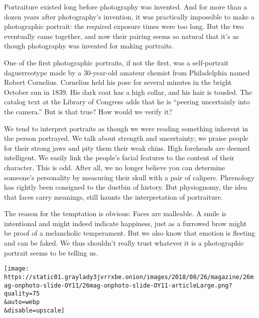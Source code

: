 Portraiture existed long before photography was invented. And for more
than a dozen years after photography's invention, it was practically
impossible to make a photographic portrait: the required exposure times
were too long. But the two eventually came together, and now their
pairing seems so natural that it's as though photography was invented
for making portraits.

One of the first photographic portraits, if not the first, was a
self-portrait daguerreotype made by a 30-year-old amateur chemist from
Philadelphia named Robert Cornelius. Cornelius held his pose for several
minutes in the bright October sun in 1839. His dark coat has a high
collar, and his hair is tousled. The catalog text at the Library of
Congress adds that he is ``peering uncertainly into the camera.'' But is
that true? How would we verify it?

We tend to interpret portraits as though we were reading something
inherent in the person portrayed. We talk about strength and
uncertainty; we praise people for their strong jaws and pity them their
weak chins. High foreheads are deemed intelligent. We easily link the
people's facial features to the content of their character. This is odd.
After all, we no longer believe you can determine someone's personality
by measuring their skull with a pair of calipers. Phrenology has rightly
been consigned to the dustbin of history. But physiognomy, the idea that
faces carry meanings, still haunts the interpretation of portraiture.

The reason for the temptation is obvious: Faces are malleable. A smile
is intentional and might indeed indicate happiness, just as a furrowed
brow might be proof of a melancholic temperament. But we also know that
emotion is fleeting and can be faked. We thus shouldn't really trust
whatever it is a photographic portrait seems to be telling us.

\texttt{[image: https://static01.graylady3jvrrxbe.onion/images/2018/08/26/magazine/26mag-onphoto-slide-OY11/26mag-onphoto-slide-OY11-articleLarge.png?quality=75\\\&auto=webp\\\&disable=upscale]}

